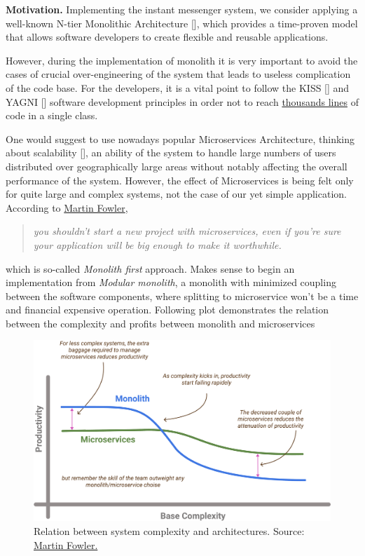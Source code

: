 \textbf{Motivation.} Implementing the instant messenger system, we consider applying a well-known N-tier
Monolithic Architecture [\cite{bucchiarone2018monolithic}], which provides a time-proven model that allows software
developers to create flexible and reusable applications.

However, during the implementation of monolith it is very important to avoid the cases of crucial over-engineering
of the system that leads to useless complication of the code base.
For the developers, it is a vital point to follow the KISS [\cite{alwin2016kiss}] and YAGNI [\cite{da2018evolution}]
software development principles in order not to reach
\href{https://github.com/smartstore/SmartStoreNET/blob/4.x/src/Presentation/SmartStore.Web/Controllers/CatalogHelper.cs}
{thousands lines}
of code in a single class.

One would suggest to use nowadays popular Microservices Architecture, thinking about scalability [\cite{brataas2004exploring}],
an ability of the system to handle large numbers of users distributed over geographically large areas without
notably affecting the overall performance of the system.
However, the effect of Microservices is being felt only for quite large and complex systems,
not the case of our yet simple application.
According to \href{https://martinfowler.com/bliki/MonolithFirst.html}{Martin Fowler},
\begin{quote}
    \textit{you shouldn't start a new project with microservices, even if you're sure your application will be big enough to
    make it worthwhile.}
\end{quote}
which is so-called \textit{Monolith first} approach.
Makes sense to begin an implementation from \textit{Modular monolith}, a monolith with minimized coupling between the
software components, where splitting to microservice won't be a time and financial expensive operation.
Following plot demonstrates the relation between the complexity and profits between monolith and microservices

\begin{figure}[H]
    \centering
    \includegraphics[width=1\textwidth]{Pictures/02_Monolith_and_Microservices_complexity}
    \caption{Relation between system complexity and architectures.
    Source: \href{https://martinfowler.com/bliki/MicroservicePremium.html}{Martin Fowler.}}
    \label{fig:monolith_vs_microservice}
\end{figure}

